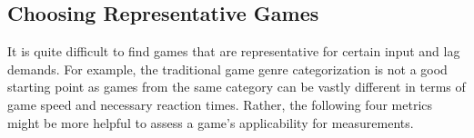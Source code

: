 \subsection{Choosing Representative Games}
\label{sec:game-criteria}

It is quite difficult to find games that are representative for certain input and lag demands. For example, the traditional game genre categorization is not a good starting point as games from the same category can be vastly different in terms of game speed and necessary reaction times. Rather, the following four metrics might be more helpful to assess a game's applicability for measurements.

